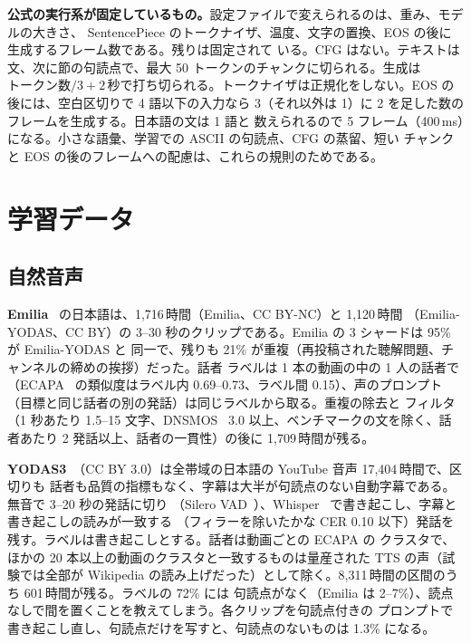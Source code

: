 \documentclass[10pt,a4paper,twocolumn]{article}
\begin{document}
\textbf{公式の実行系が固定しているもの。}設定ファイルで変えられるのは、重み、モデルの大きさ、
SentencePiece のトークナイザ、温度、文字の置換、EOS の後に生成するフレーム数である。残りは固定されて
いる。CFG はない。テキストは文、次に節の句読点で、最大 50 トークンのチャンクに切られる。生成は
$\text{トークン数}/3+2$\,秒で打ち切られる。トークナイザは正規化をしない。EOS の後には、空白区切りで
4 語以下の入力なら 3（それ以外は 1）に 2 を足した数のフレームを生成する。日本語の文は 1 語と
数えられるので 5 フレーム（400\,ms）になる。小さな語彙、学習での ASCII の句読点、CFG の蒸留、短い
チャンクと EOS の後のフレームへの配慮は、これらの規則のためである。

\section{学習データ}\label{sec:data}
\subsection{自然音声}
\textbf{Emilia}~\cite{emilia,emilialarge} の日本語は、1,716\,時間（Emilia、CC BY-NC）と 1,120\,時間
（Emilia-YODAS、CC BY）の 3--30 秒のクリップである。Emilia の 3 シャードは 95\% が Emilia-YODAS と
同一で、残りも 21\% が重複（再投稿された聴解問題、チャンネルの締めの挨拶）だった。話者
ラベルは 1 本の動画の中の 1 人の話者で（ECAPA~\cite{ecapa} の類似度はラベル内 0.69--0.73、ラベル間
0.15）、声のプロンプト（目標と同じ話者の別の発話）は同じラベルから取る。重複の除去と
フィルタ（1 秒あたり 1.5--15 文字、DNSMOS~\cite{dnsmos} 3.0 以上、ベンチマークの文を除く、話者あたり
2 発話以上、話者の一貫性）の後に 1,709\,時間が残る。

\textbf{YODAS3}~\cite{yodas,yodas3}（CC BY 3.0）は全帯域の日本語の YouTube 音声 17,404\,時間で、区切りも
話者も品質の指標もなく、字幕は大半が句読点のない自動字幕である。無音で 3--20 秒の発話に切り
（Silero VAD~\cite{silero}）、Whisper~\cite{whisper} で書き起こし、字幕と書き起こしの読みが一致する
（フィラーを除いたかな CER 0.10 以下）発話を残す。ラベルは書き起こしとする。話者は動画ごとの ECAPA の
クラスタで、ほかの 20 本以上の動画のクラスタと一致するものは量産された TTS の声（試験では全部が
Wikipedia の読み上げだった）として除く。8,311\,時間の区間のうち 601\,時間が残る。ラベルの 72\% には
句読点がなく（Emilia は 2--7\%）、読点なしで間を置くことを教えてしまう。各クリップを句読点付きの
プロンプトで書き起こし直し、句読点だけを写すと、句読点のないものは 1.3\% になる。
\end{document}
